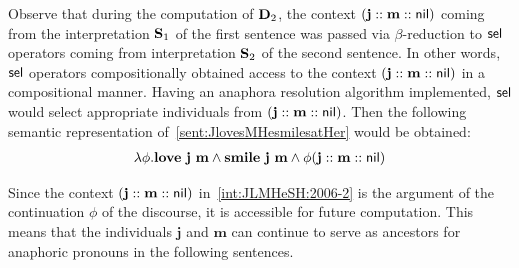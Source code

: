 
Observe that during the computation of $\D_2$, the context $(\textbf{j} :: \textbf{m}::\nil)$ coming from the interpretation $\S_1$ of the first sentence was passed via $\beta$-reduction to $\selK$ operators coming from interpretation $\S_2$ of the second sentence. In other words, $\selK$ operators compositionally obtained access to the context $(\textbf{j} :: \textbf{m}::\nil)$ in a compositional manner. Having an anaphora resolution algorithm implemented, $\selK$ would select appropriate individuals from $(\textbf{j} :: \textbf{m}::\nil)$. Then
the following semantic representation of~\eqref{sent:JlovesMHesmilesatHer} would be obtained: 
\begin{align}
\lambda \phi.\textbf{love} \  \textbf{j} \ \textbf{m} \land    \textbf{smile}  \ \textbf{j} \ \textbf{m} \land \phi   (\textbf{j} :: \textbf{m}::\nil) \label{int:JLMHeSH:2006-2}
\end{align}


Since the context $ (\textbf{j} :: \textbf{m}::\nil)$ in~\eqref{int:JLMHeSH:2006-2} is the argument of the continuation $\phi$ of the discourse, it is accessible for future computation. This means that the individuals $\textbf{j}$ and $\textbf{m}$ can continue to serve as ancestors for anaphoric pronouns in the following sentences. 
